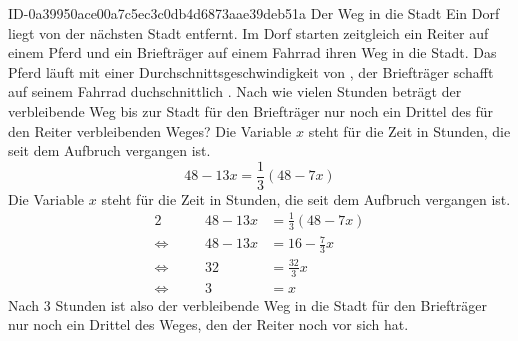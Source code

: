 \begin{exercise}
      {ID-0a39950ace00a7c5ec3c0db4d6873aae39deb51a}
      {Der Weg in die Stadt}
  \ifproblem\problem
    Ein Dorf liegt  von der nächsten Stadt entfernt. Im Dorf starten zeitgleich
    ein Reiter auf einem Pferd und ein Briefträger auf einem Fahrrad ihren Weg in die Stadt.
    Das Pferd läuft mit einer Durchschnittsgeschwindigkeit von , der Briefträger
    schafft auf seinem Fahrrad duchschnittlich . Nach wie vielen Stunden beträgt
    der verbleibende Weg bis zur Stadt für den Briefträger nur noch ein Drittel des für
    den Reiter verbleibenden Weges?
  \fi
  \ifoutline\outline
    Die Variable $x$ steht für die Zeit in Stunden, die seit dem Aufbruch
    vergangen ist.
    \begin{equation*}
      48-13x=\frac{1}{3}(48-7x)
    \end{equation*}
  \fi
  \ifoutcome\outcome
    Die Variable $x$ steht für die Zeit in Stunden, die seit dem Aufbruch
    vergangen ist.
    \newcommand{\aq}{\Leftrightarrow}%
    \begin{alignat*}{2}
         &\quad & 48-13x&=\frac{1}{3}(48-7x) \\
      \aq&\quad & 48-13x&=16-\frac{7}{3}x \\
      \aq&\quad &     32&=\frac{32}{3}x \\
      \aq&\quad &      3&=x
    \end{alignat*}
    Nach 3 Stunden ist also der verbleibende Weg in die Stadt für den Briefträger
    nur noch ein Drittel des Weges, den der Reiter noch vor sich hat.
  \fi
\end{exercise}
